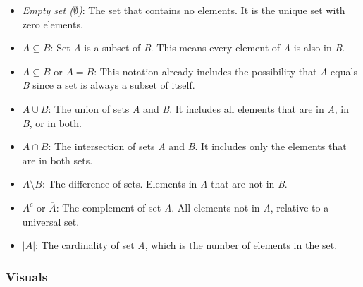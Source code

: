 \begin{itemize}

	\item \emph{Empty set (\(\emptyset\))}: The set that contains no elements. It is the unique set with 
	      zero elements.

	\item \(A \subseteq B\): Set \emph{A} is a subset of \emph{B}. This means every element of 
		  \emph{A} is also in \emph{B}.

	\item \(A \subseteq B\) or \(A = B\): This notation already includes the possibility that \emph{A} 
		  equals \emph{B} since a set is always a subset of itself.

	\item \(A \cup B\): The union of sets \emph{A} and \emph{B}. It includes all elements 
	      that are in \emph{A}, in \emph{B}, or in both.

	\item \(A \cap B\): The intersection of sets \emph{A} and \emph{B}. It includes only the elements 
	      that are in both sets.

	\item \(A \setminus B\): The difference of sets. Elements in \emph{A} that are not in \emph{B}.

	\item \(A^c\) or \(\overline{A}\): The complement of set \emph{A}. All elements not in \emph{A}, 
		  relative to  a universal set.

	\item \(|A|\): The cardinality of set \emph{A}, which is the number of elements in the set.

\end{itemize}
\smallskip

\subsubsection{Visuals}


